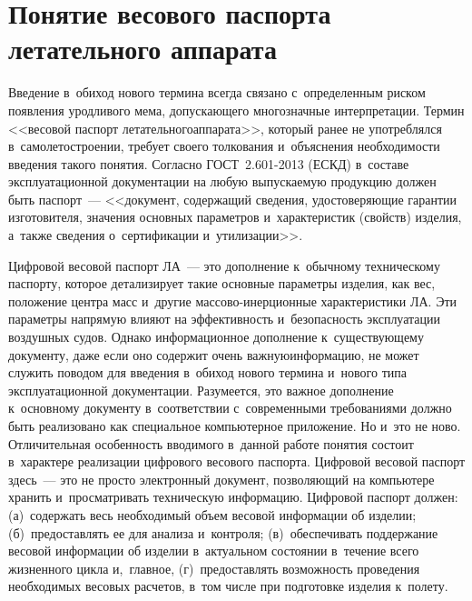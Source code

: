 \vspace*{-4pt}



\thispagestyle{headings}

\begin{multicols}{2}

\label{st\stat}
  
\section{Понятие весового паспорта летательного аппарата}

\vspace*{-4pt}

  Введение в~обиход нового термина всегда связано с~определенным риском 
появления урод\-ли\-вого мема, допускающего многозначные ин\-тер\-пре\-тации. 
Термин <<весовой паспорт летательного\linebreak аппарата>>, который ранее не 
употреблялся в~самолетостроении, требует своего толкования и~объяснения 
необходимости введения такого понятия. Согласно ГОСТ~2.601-2013 (ЕСКД) 
в~со\-ста\-ве эксплуатационной документации на любую вы\-пус\-ка\-емую продукцию 
должен быть паспорт~--- <<документ, содержащий сведения, удостоверяющие\linebreak 
гарантии изготовителя, значения основных па\-ра\-мет\-ров и~характеристик 
(свойств) изделия, а~также сведения о~сертификации и~утилизации>>. 
  
  Цифровой весовой паспорт ЛА~--- это дополнение к~обычному техническому 
паспорту, которое детализирует такие основные параметры изделия, как вес, 
положение центра масс и~другие мас\-со\-во-инер\-ци\-он\-ные характеристики 
ЛА. Эти па\-ра\-метры напрямую влияют на эффективность 
и~безопас\-ность эксплуатации воздушных судов. Однако информационное 
дополнение к~существующему документу, даже если оно содержит очень 
важную\linebreak информацию, не может служить поводом для введения в~обиход 
нового термина и~нового типа эксплуатационной документации. Разумеется, 
это важное дополнение к~основному документу в~соответствии с~современными 
требованиями должно быть реализовано как специальное компьютерное 
приложение. Но и~это не ново. Отличительная особенность вводимого  
в~данной работе понятия со\-сто\-ит в~характере реализации циф\-ро\-во\-го весового 
паспорта. Цифровой весовой паспорт здесь~--- это не просто электронный 
документ, позволяющий на компьютере хранить и~просматривать техническую 
информацию. Цифровой паспорт должен: (а)~содержать весь необходимый 
объем весовой информации об изделии; (б)~предоставлять ее для анализа 
и~контроля; (в)~обеспечивать поддержание весовой информации об изделии 
в~актуальном со\-сто\-янии в~течение всего жизненного цик\-ла и,~главное, 
(г)~предостав\-лять воз\-мож\-ность проведения необходимых весовых расчетов, в~том 
числе при подготовке изделия к~полету. 
  

\end{multicols}
